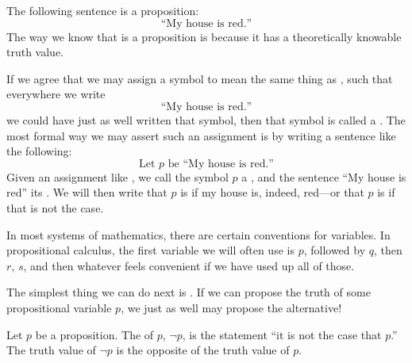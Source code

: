 \begin{ex}
  The following sentence is a proposition:
  \begin{equation}
    \text{``My house is red.''}
    \label{eq:ex:proposition}
  \end{equation}
  The way we know that  is a proposition is because
  it has a theoretically knowable truth value.

  If we agree that we may assign a symbol to mean the same thing as
  ,
  such that everywhere we write
  \begin{equation*}
    \text{``My house is red.''}
  \end{equation*}
  we could have just as well written that symbol, then that symbol is called
  a .
  The most formal way we may assert such an assignment is by writing
  a sentence like the following:
  \begin{equation}
    \text{Let $p$ be ``My house is red.''}
    \label{eq:propostional-symbolic-notation}
  \end{equation}
  Given an assignment like ,
  we call the symbol $p$ a ,
  and the sentence ``My house is red'' its .
  We will then write that $p$ is \ltrue{} if my house is, indeed,
  red---or that $p$ is \lfalse{} if that is not the case.
\end{ex}

In most systems of mathematics, there are certain conventions for variables.
In propositional calculus, the first variable we will often use is $p$, followed
by $q$, then $r$, $s$, and then whatever feels convenient if we have used up
all of those.

The simplest thing we can do next is .
If we can propose the truth of some propositional variable $p$,
we just as well may propose the alternative!
\begin{defn}[negation]
  Let $p$ be a proposition.
  The  of $p$,
  $\neg p$,
  is the statement
  ``it is not the case that \(p\).''
  The truth value of \(\neg p\) is the opposite of the truth value of \(p\).
  \label{defn:propositional-negation}
\end{defn}

